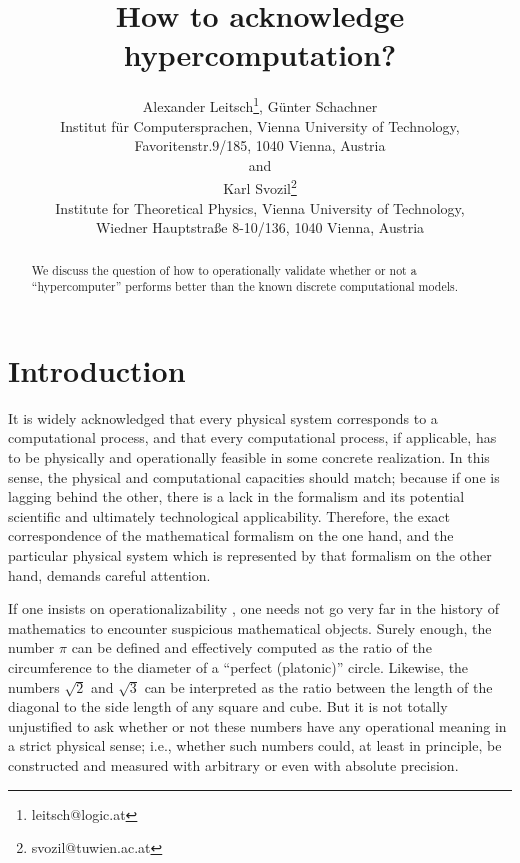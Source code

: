 \documentclass[12pt]{article}
\begin{document}
\title{How to acknowledge hypercomputation?}
\author{Alexander Leitsch\footnote{leitsch@logic.at}, G{\"{u}}nter Schachner \\
 {\small Institut f{\"{u}}r Computersprachen, Vienna University of Technology,}\\ {\small   Favoritenstr.9/185, 1040 Vienna, Austria}\\
{and}\\
Karl Svozil\footnote{svozil@tuwien.ac.at} \\
 {\small Institute for Theoretical Physics, Vienna University of Technology,}\\ {\small   Wiedner Hauptstra\ss e 8-10/136, 1040 Vienna, Austria}
      }
\date{ }
\maketitle


\begin{abstract}
We discuss the question of how to operationally validate whether or not a ``hypercomputer'' performs better than the known discrete computational models.
\end{abstract}

\section{Introduction}

It is widely acknowledged \cite{wolfram-2002,svozil-2005-cu} that every physical system corresponds to a computational process,
and that every computational process, if applicable, has to be physically and operationally feasible in some concrete realization.
In this sense, the physical and computational capacities should match;
because if one is lagging behind the other,
there is a lack in the formalism and its potential scientific and ultimately technological applicability.
Therefore, the exact correspondence of the mathematical formalism on the one hand, and
the particular physical system which is represented by that formalism  on the other hand, demands careful attention.



If one insists on operationalizability
\cite{bridgman},
one needs not go very far in the history of mathematics to encounter
suspicious mathematical objects.
Surely enough, the number $\pi$ can be defined and effectively computed as the ratio of the
circumference to the diameter of a ``perfect (platonic)'' circle.
Likewise, the numbers $\sqrt{2}$ and $\sqrt{3}$ can be interpreted as the ratio
between the length of the diagonal to
the side length of any square and cube.
But it is not totally unjustified to ask whether or not these numbers have
any operational meaning
in a strict physical sense; i.e., whether such numbers could, at least in
principle, be constructed and measured with arbitrary or even with absolute
precision.
\end{document}
